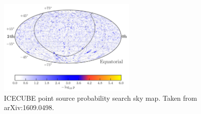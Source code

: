 \documentclass[a4paper,12pt,twoside]{article}
\begin{document}
\begin{figure}[!htp]
\centering
\includegraphics[width=0.6\textwidth]{ICECUBE_eventmap.png}
\caption{ICECUBE point source probability search sky map. Taken from arXiv:1609.0498.}
\label{fig:ICECUBE_probMap}
\end{figure}
\end{document}
